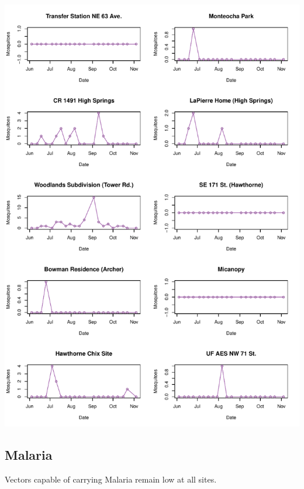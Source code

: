 \documentclass{article}
\begin{document}
\begin{center}
\includegraphics{mosq04nov13-011}
\newpage
\subsection*{Malaria}

\end{center}

Vectors capable of carrying Malaria remain low at all sites.\\
\end{document}
